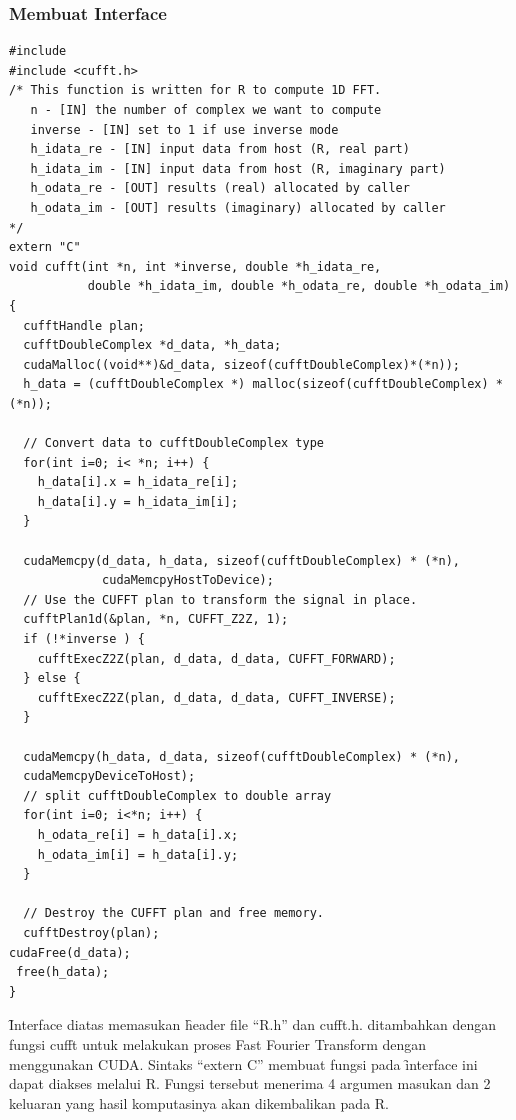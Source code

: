 \subsubsection{Membuat Interface}

\begin{lstlisting}
#include 
#include <cufft.h>
/* This function is written for R to compute 1D FFT.
   n - [IN] the number of complex we want to compute
   inverse - [IN] set to 1 if use inverse mode
   h_idata_re - [IN] input data from host (R, real part)
   h_idata_im - [IN] input data from host (R, imaginary part)
   h_odata_re - [OUT] results (real) allocated by caller
   h_odata_im - [OUT] results (imaginary) allocated by caller
*/
extern "C"
void cufft(int *n, int *inverse, double *h_idata_re,
           double *h_idata_im, double *h_odata_re, double *h_odata_im)
{
  cufftHandle plan;
  cufftDoubleComplex *d_data, *h_data;
  cudaMalloc((void**)&d_data, sizeof(cufftDoubleComplex)*(*n));
  h_data = (cufftDoubleComplex *) malloc(sizeof(cufftDoubleComplex) * (*n));

  // Convert data to cufftDoubleComplex type
  for(int i=0; i< *n; i++) {
    h_data[i].x = h_idata_re[i];
    h_data[i].y = h_idata_im[i];
  }
 
  cudaMemcpy(d_data, h_data, sizeof(cufftDoubleComplex) * (*n), 
             cudaMemcpyHostToDevice);
  // Use the CUFFT plan to transform the signal in place.
  cufftPlan1d(&plan, *n, CUFFT_Z2Z, 1);
  if (!*inverse ) {
    cufftExecZ2Z(plan, d_data, d_data, CUFFT_FORWARD);
  } else {
    cufftExecZ2Z(plan, d_data, d_data, CUFFT_INVERSE);
  }

  cudaMemcpy(h_data, d_data, sizeof(cufftDoubleComplex) * (*n), 
  cudaMemcpyDeviceToHost);
  // split cufftDoubleComplex to double array
  for(int i=0; i<*n; i++) {
    h_odata_re[i] = h_data[i].x;
    h_odata_im[i] = h_data[i].y;
  }
 
  // Destroy the CUFFT plan and free memory.
  cufftDestroy(plan);
cudaFree(d_data);
 free(h_data);
}
\end{lstlisting}

\f{Interface} diatas  memasukan  \f{header file} “R.h” dan cufft.h. ditambahkan dengan fungsi cufft untuk melakukan proses Fast Fourier Transform dengan menggunakan CUDA. Sintaks “extern C” membuat fungsi pada \f{interface} ini dapat diakses melalui R. Fungsi tersebut menerima 4 argumen masukan dan 2 keluaran yang hasil komputasinya akan dikembalikan pada R.

